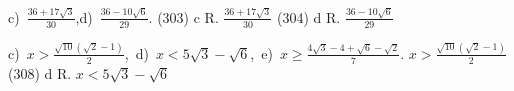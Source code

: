 
c)~$\frac{36+17\sqrt 3}{30}$,\quad d)~$\frac{36-10\sqrt 6}{29}$.
(303) c R. $\frac{36+17\sqrt 3}{30}$ (304) d R. $\frac{36-10\sqrt 6}{29}$

c)~$x>\frac{\sqrt{10}(\sqrt 2-1)} 2$,\, d)~$x<5\sqrt 3-\sqrt 6$,\, e)~$x\ge 
\frac{4\sqrt 3-4+\sqrt 6-\sqrt 2} 7$.
$x>\frac{\sqrt{10}(\sqrt 2-1)} 2$ (308) d R. $x<5\sqrt 3-\sqrt 6$


